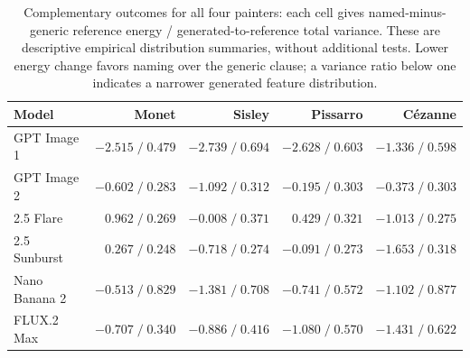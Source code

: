\begin{table}[htbp]\centering\small
\begin{tabular}{lrrrr}\toprule
Model & Monet & Sisley & Pissarro & C\'ezanne\\\midrule
GPT Image 1 & $-2.515\; /\; 0.479$ & $-2.739\; /\; 0.694$ & $-2.628\; /\; 0.603$ & $-1.336\; /\; 0.598$\\
GPT Image 2 & $-0.602\; /\; 0.283$ & $-1.092\; /\; 0.312$ & $-0.195\; /\; 0.303$ & $-0.373\; /\; 0.303$\\
2.5 Flare & $0.962\; /\; 0.269$ & $-0.008\; /\; 0.371$ & $0.429\; /\; 0.321$ & $-1.013\; /\; 0.275$\\
2.5 Sunburst & $0.267\; /\; 0.248$ & $-0.718\; /\; 0.274$ & $-0.091\; /\; 0.273$ & $-1.653\; /\; 0.318$\\
Nano Banana 2 & $-0.513\; /\; 0.829$ & $-1.381\; /\; 0.708$ & $-0.741\; /\; 0.572$ & $-1.102\; /\; 0.877$\\
FLUX.2 Max & $-0.707\; /\; 0.340$ & $-0.886\; /\; 0.416$ & $-1.080\; /\; 0.570$ & $-1.431\; /\; 0.622$\\
\bottomrule\end{tabular}
\caption{Complementary outcomes for all four painters: each cell gives named-minus-generic reference energy / generated-to-reference total variance. These are descriptive empirical distribution summaries, without additional tests. Lower energy change favors naming over the generic clause; a variance ratio below one indicates a narrower generated feature distribution.}
\label{tab:artist-distributions}\end{table}
